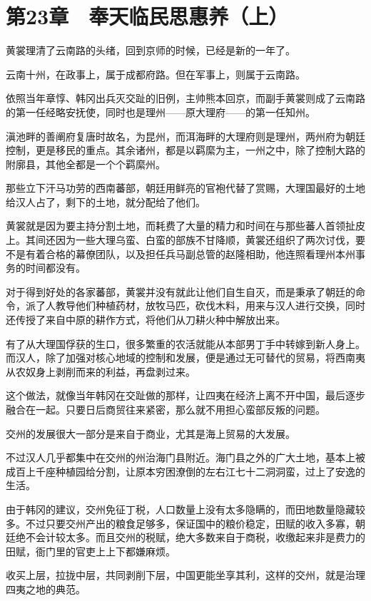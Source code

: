 \section{第23章　奉天临民思惠养（上）}

黄裳理清了云南路的头绪，回到京师的时候，已经是新的一年了。

云南十州，在政事上，属于成都府路。但在军事上，则属于云南路。

依照当年章惇、韩冈出兵灭交趾的旧例，主帅熊本回京，而副手黄裳则成了云南路的第一任经略安抚使，同时也是理州——原大理府——的第一任知州。

滇池畔的善阐府复唐时故名，为昆州，而洱海畔的大理府则是理州，两州府为朝廷控制，更是移民的重点。其余诸州，都是以羁縻为主，一州之中，除了控制大路的附廓县，其他全都是一个个羁縻州。

那些立下汗马功劳的西南蕃部，朝廷用鲜亮的官袍代替了赏赐，大理国最好的土地给汉人占了，剩下的土地，就分配给了他们。

黄裳就是因为要主持分割土地，而耗费了大量的精力和时间在与那些蕃人首领扯皮上。其间还因为一些大理乌蛮、白蛮的部族不甘降顺，黄裳还组织了两次讨伐，要不是有着合格的幕僚团队，以及担任兵马副总管的赵隆相助，他连照看理州本州事务的时间都没有。

对于得到好处的各家蕃部，黄裳并没有就此让他们自生自灭，而是秉承了朝廷的命令，派了人教导他们种植药材，放牧马匹，砍伐木料，用来与汉人进行交换，同时还传授了来自中原的耕作方式，将他们从刀耕火种中解放出来。

有了从大理国俘获的生口，很多繁重的农活就能从本部男丁手中转嫁到新人身上。而汉人，除了加强对核心地域的控制和发展，便是通过无可替代的贸易，将西南夷从农奴身上剥削而来的利益，再盘剥过来。

这个做法，就像当年韩冈在交趾做的那样，让四夷在经济上离不开中国，最后逐步融合在一起。只要日后商贸往来紧密，那么就不用担心蛮部反叛的问题。

交州的发展很大一部分是来自于商业，尤其是海上贸易的大发展。

不过汉人几乎都集中在交州的州治海门县附近。海门县之外的广大土地，基本上被成百上千座种植园给分割，让原本穷困潦倒的左右江七十二洞洞蛮，过上了安逸的生活。

由于韩冈的建议，交州免征丁税，人口数量上没有太多隐瞒的，而田地数量隐藏较多。不过只要交州产出的粮食足够多，保证国中的粮价稳定，田赋的收入多寡，朝廷绝不会计较太多。而且交州的税赋，绝大多数来自于商税，收缴起来非是费力的田赋，衙门里的官吏上上下都嫌麻烦。

收买上层，拉拢中层，共同剥削下层，中国更能坐享其利，这样的交州，就是治理四夷之地的典范。


